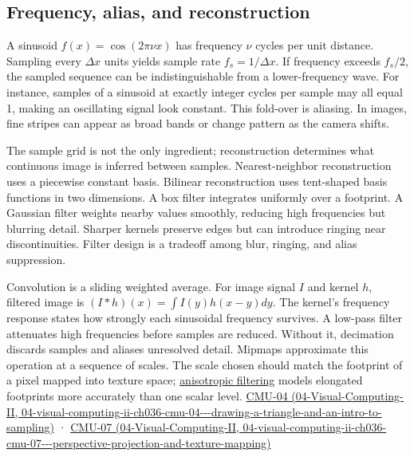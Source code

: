 \subsection{Frequency, alias, and reconstruction}\label{03-visual-computing-i-ch003-frequency-alias-and-reconstruction}

A sinusoid \(f(x)=\cos(2\pi \nu x)\) has frequency \(\nu\) cycles per unit distance. Sampling every \(\Delta x\) units yields sample rate \(f_s=1/\Delta x\). If frequency exceeds \(f_s/2\), the sampled sequence can be indistinguishable from a lower-frequency wave. For instance, samples of a sinusoid at exactly integer cycles per sample may all equal 1, making an oscillating signal look constant. This fold-over is aliasing. In images, fine stripes can appear as broad bands or change pattern as the camera shifts.

The sample grid is not the only ingredient; reconstruction determines what continuous image is inferred between samples. Nearest-neighbor reconstruction uses a piecewise constant basis. Bilinear reconstruction uses tent-shaped basis functions in two dimensions. A box filter integrates uniformly over a footprint. A Gaussian filter weights nearby values smoothly, reducing high frequencies but blurring detail. Sharper kernels preserve edges but can introduce ringing near discontinuities. Filter design is a tradeoff among blur, ringing, and alias suppression.

Convolution is a sliding weighted average. For image signal \(I\) and kernel \(h\), filtered image is \((I*h)(x)=\int I(y)h(x-y)dy\). The kernel's frequency response states how strongly each sinusoidal frequency survives. A low-pass filter attenuates high frequencies before samples are reduced. Without it, decimation discards samples and aliases unresolved detail. Mipmaps approximate this operation at a sequence of scales. The scale chosen should match the footprint of a pixel mapped into texture space; \hyperref[appendix-d5b3c692d9f0]{anisotropic filtering} models elongated footprints more accurately than one scalar level. \href{../04-Visual-Computing-II/main.pdf\#nameddest=04-visual-computing-ii-ch036-cmu-04---drawing-a-triangle-and-an-intro-to-sampling}{CMU-04 (04-Visual-Computing-II, 04-visual-computing-ii-ch036-cmu-04-\/-\/-drawing-a-triangle-and-an-intro-to-sampling)} · \href{../04-Visual-Computing-II/main.pdf\#nameddest=04-visual-computing-ii-ch036-cmu-07---perspective-projection-and-texture-mapping}{CMU-07 (04-Visual-Computing-II, 04-visual-computing-ii-ch036-cmu-07-\/-\/-perspective-projection-and-texture-mapping)}


